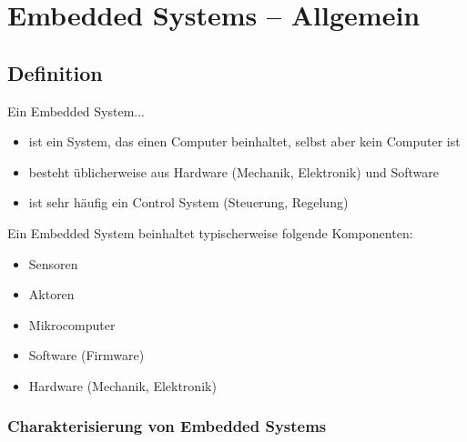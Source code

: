 \section{Embedded Systems -- Allgemein}
\subsection{Definition}

Ein Embedded System...

\begin{itemize}
    \item ist ein System, das einen Computer beinhaltet, selbst aber kein Computer ist
    \item besteht üblicherweise aus Hardware (Mechanik, Elektronik) und Software
    \item ist sehr häufig ein Control System (Steuerung, Regelung)
\end{itemize}

\vspace{0.2cm}

Ein Embedded System beinhaltet typischerweise folgende Komponenten:

\begin{minipage}[t]{0.15\columnwidth}
    \begin{itemize}
        \item Sensoren
        \item Aktoren
    \end{itemize}
\end{minipage}
\hfill
\begin{minipage}[t]{0.3\columnwidth}
    \begin{itemize}
        \item Mikrocomputer
        \item Software (Firmware)
    \end{itemize}
\end{minipage}
\hfill
\begin{minipage}[t]{0.45\columnwidth}
    \begin{itemize}
        \item Hardware (Mechanik, Elektronik)
    \end{itemize}
\end{minipage}


\subsubsection{Charakterisierung von Embedded Systems}

